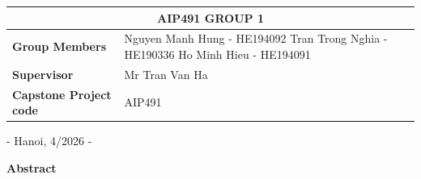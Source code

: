 \documentclass[sn-mathphys, oneside]{sn-jnl}
\begin{document}
\begin{titlepage}
\begin{center}
        \begin{tabular}{|p{4.5cm}|p{10cm}|}
            \hline
            \multicolumn{2}{|c|}{\textbf{AIP491 GROUP 1}} \\ 
            \hline
            \textbf{Group Members} & 
           Nguyen Manh Hung - HE194092  \newline
           Tran Trong Nghia - HE190336
            \newline
            Ho Minh Hieu - HE194091 \\
            \hline
            \textbf{Supervisor} &  Mr Tran Van Ha\\ %
            \hline
            \textbf{Capstone Project code} & AIP491  \\
            \hline
        \end{tabular}
    \end{center}

    \vfill

    {\large - Hanoi, 4/2026 - \par}
    
\end{titlepage}

\clearpage %
\begin{center}
    \bfseries\Large Abstract
\end{center}
\end{document}

